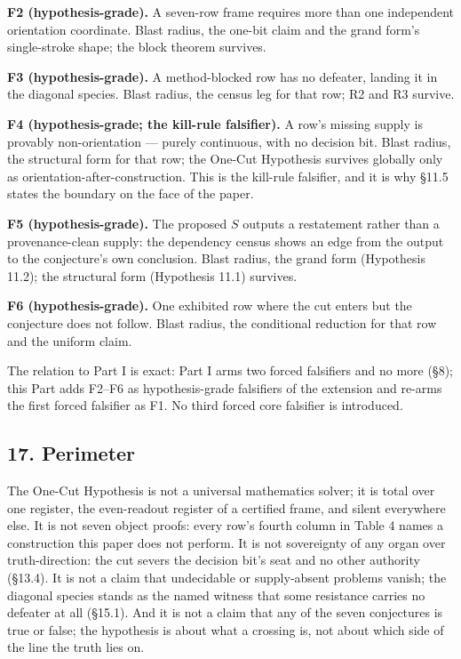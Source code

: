 \documentclass[10pt,twocolumn]{article}
\begin{document}
\textbf{F2 (hypothesis-grade).} A seven-row frame requires more than one
independent orientation coordinate. Blast radius, the one-bit claim and
the grand form's single-stroke shape; the block theorem survives.

\textbf{F3 (hypothesis-grade).} A method-blocked row has no defeater,
landing it in the diagonal species. Blast radius, the census leg for
that row; R2 and R3 survive.

\textbf{F4 (hypothesis-grade; the kill-rule falsifier).} A row's missing
supply is provably non-orientation --- purely continuous, with no
decision bit. Blast radius, the structural form for that row; the
One-Cut Hypothesis survives globally only as
orientation-after-construction. This is the kill-rule falsifier, and it
is why §11.5 states the boundary on the face of the paper.

\textbf{F5 (hypothesis-grade).} The proposed \(S\) outputs a restatement
rather than a provenance-clean supply: the dependency census shows an
edge from the output to the conjecture's own conclusion. Blast radius,
the grand form (Hypothesis 11.2); the structural form (Hypothesis 11.1)
survives.

\textbf{F6 (hypothesis-grade).} One exhibited row where the cut enters
but the conjecture does not follow. Blast radius, the conditional
reduction for that row and the uniform claim.

The relation to Part I is exact: Part I arms two forced falsifiers and
no more (§8); this Part adds F2--F6 as hypothesis-grade falsifiers of
the extension and re-arms the first forced falsifier as F1. No third
forced core falsifier is introduced.

\subsection{17. Perimeter}\label{perimeter}

The One-Cut Hypothesis is not a universal mathematics solver; it is
total over one register, the even-readout register of a certified frame,
and silent everywhere else. It is not seven object proofs: every row's
fourth column in Table 4 names a construction this paper does not
perform. It is not sovereignty of any organ over truth-direction: the
cut severs the decision bit's seat and no other authority (§13.4). It is
not a claim that undecidable or supply-absent problems vanish; the
diagonal species stands as the named witness that some resistance
carries no defeater at all (§15.1). And it is not a claim that any of
the seven conjectures is true or false; the hypothesis is about what a
crossing is, not about which side of the line the truth lies on.
\end{document}
